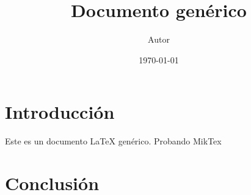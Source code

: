 \documentclass{article}
\title{Documento gen\'erico}
\author{Autor}
\date{\today}
\begin{document}
\maketitle

\section{Introducci\'on}
Este es un documento LaTeX gen\'erico. Probando MikTex


\section{Conclusi\'on}
\end{document}
